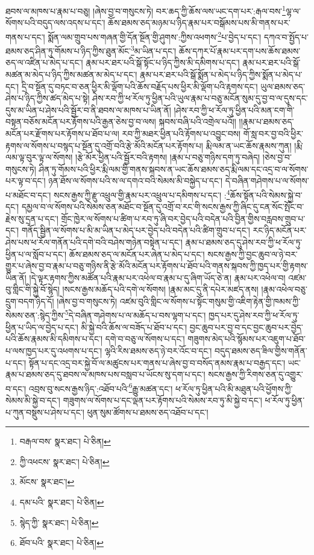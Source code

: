 ཐབས་ལ་མཁས་པ་རྣམ་པ་བཅུ། །ཞེས་བྱ་བ་གསུངས་ཏེ། བར་ཆད་ཀྱི་ཆོས་ལས་ཡང་དག་པར་:རྒལ་བས་\footnote{བརྒལ་བས་  སྣར་ཐང་།  པེ་ཅིན། }ལྷ་ལ་སོགས་པའི་བདུད་ལས་འདས་པ་དང་། ཆོས་ཐམས་ཅད་མཉམ་པ་ཉིད་རྣམ་པར་བསྒོམས་པས་མི་གནས་པར་གནས་པ་དང་། སྨོན་ལམ་གྲུབ་པས་གཞན་གྱི་དོན་སྔོན་གྱི་ཤུགས་:ཀྱིས་འཕགས་\footnote{ཀྱི་འཕངས་  སྣར་ཐང་།  པེ་ཅིན། }པ་བྱེད་པ་དང་། དཀའ་བ་སྤྱོད་པ་ཐམས་ཅད་ཤིན་ཏུ་གོམས་པ་ཉིད་ཀྱིས་ཐུན་མོང་\footnote{མོངས་  སྣར་ཐང་། }མ་ཡིན་པ་དང་། ཆོས་དཀར་པོ་རྣམ་པར་དག་པས་ཆོས་ཐམས་ཅད་ལ་འཛིན་པ་མེད་པ་དང་། རྣམ་པར་ཐར་པའི་སྒོ་སྟོང་པ་ཉིད་ཀྱིས་མི་དམིགས་པ་དང་། རྣམ་པར་ཐར་པའི་སྒོ་མཚན་མ་མེད་པ་ཉིད་ཀྱིས་མཚན་མ་མེད་པ་དང་། རྣམ་པར་ཐར་པའི་སྒོ་སྨོན་པ་མེད་པ་ཉིད་ཀྱིས་སྨོན་པ་མེད་པ་དང་། དྲི་བ་སྔོན་དུ་བཏང་བ་ཅན་ཕྱིར་མི་ལྡོག་པའི་ཆོས་བརྗོད་པས་ཕྱིར་མི་ལྡོག་པའི་རྟགས་དང་། ཡུལ་ཐམས་ཅད་ཤེས་པ་ཉིད་ཀྱིས་ཚད་མེད་པ་སྟེ། ཤེས་རབ་ཀྱི་ཕ་རོལ་ཏུ་ཕྱིན་པའི་ཡུལ་རྣམ་པ་བཅུ་མངོན་སུམ་དུ་བྱ་བ་ལ་དུས་དང་དུས་མ་ཡིན་པ་ཤེས་པའི་སྦྱོར་བ་ནི་ཐབས་ལ་མཁས་པ་ཡིན་ནོ། །ཤེས་རབ་ཀྱི་ཕ་རོལ་ཏུ་ཕྱིན་པའི་མན་ངག་གི་བསྟན་བཅོས་མངོན་པར་རྟོགས་པའི་རྒྱན་ཅེས་བྱ་བ་ལས། སྐབས་བཞི་པའི་འགྲེལ་པའོ།། །།རྣམ་པ་ཐམས་ཅད་མངོན་པར་རྫོགས་པར་རྟོགས་པ་ཐོབ་པ་ལ། རབ་ཀྱི་མཐར་ཕྱིན་པའི་རྟོགས་པ་འབྱུང་བས། གོ་སླ་བར་བྱ་བའི་ཕྱིར་རྟགས་ལ་སོགས་པ་བསྙད་པ་སྔོན་དུ་འགྲོ་བའི་རྩེ་མོའི་མངོན་པར་རྟོགས་པ། རྨི་ལམ་ན་ཡང་ཆོས་རྣམས་ཀུན། །རྨི་ལམ་ལྟ་བུར་ལྟ་ལ་སོགས། །རྩེ་མོར་ཕྱིན་པའི་སྦྱོར་བའི་རྟགས། །རྣམ་པ་བཅུ་གཉིས་དག་ཏུ་བཞེད། །ཅེས་བྱ་བ་གསུངས་ཏེ། ཤིན་ཏུ་གོམས་པའི་ཕྱིར་རྨི་ལམ་གྱི་གནས་སྐབས་ན་ཡང་ཆོས་ཐམས་ཅད་རྨི་ལམ་དང་འདྲ་བ་ལ་སོགས་པར་ལྟ་བ་དང་། ཉན་ཐོས་ལ་སོགས་པའི་ས་ལ་དགའ་བའི་སེམས་མི་བསྐྱེད་པ་དང་། དེ་བཞིན་གཤེགས་པ་ལ་སོགས་པ་མཐོང་བ་དང་། སངས་རྒྱས་ཀྱི་རྫུ་འཕྲུལ་གྱི་རྣམ་པར་འཕྲུལ་པ་དམིགས་པ་དང་། :\footnote{དམ་པའི་  སྣར་ཐང་།  པེ་ཅིན། }ཆོས་སྟོན་པའི་སེམས་སྐྱེ་བ་དང་། དམྱལ་བ་ལ་སོགས་པའི་སེམས་ཅན་མཐོང་བ་སྔོན་དུ་འགྲོ་བ་རང་གི་སངས་རྒྱས་ཀྱི་ཞིང་དུ་ངན་སོང་སྤོང་བ་རྗེས་སུ་དྲན་པ་དང་། གྲོང་ཁྱེར་ལ་སོགས་པ་ཚིག་པ་རབ་ཏུ་ཞི་བར་བྱེད་པའི་བདེན་པའི་བྱིན་གྱིས་བརླབས་གྲུབ་པ་དང་། གནོད་སྦྱིན་ལ་སོགས་པ་མི་མ་ཡིན་པ་མེད་པར་བྱེད་པའི་བདེན་པའི་ཚིག་གྲུབ་པ་དང་། རང་ཉིད་མངོན་པར་ཤེས་པས་ཕ་རོལ་གནོན་པའི་དགེ་བའི་བཤེས་གཉེན་བསྟེན་པ་དང་། རྣམ་པ་ཐམས་ཅད་དུ་ཤེས་རབ་ཀྱི་ཕ་རོལ་ཏུ་ཕྱིན་པ་ལ་སློབ་པ་དང་། ཆོས་ཐམས་ཅད་ལ་མངོན་པར་ཞེན་པ་མེད་པ་དང་། སངས་རྒྱས་ཀྱི་བྱང་ཆུབ་ལ་ཉེ་བར་གྱུར་པ་ཞེས་བྱ་བ་རྣམ་པ་བཅུ་གཉིས་ནི་རྩེ་མོའི་མངོན་པར་རྟོགས་པ་ཐོབ་པའི་གནས་སྐབས་ཀྱི་ཁྱད་པར་གྱི་རྟགས་ཡིན་ནོ། །དེ་ལྟར་རྟགས་ཀྱིས་མཚོན་པའི་རྣམ་པར་འཕེལ་བ་རྣམ་པ་དུ་ཞིག་ཡོད་ཅེ་ན། རྣམ་པར་འཕེལ་བ། འཛམ་བུ་གླིང་གི་སྐྱེ་བོ་སྙེད། །སངས་རྒྱས་མཆོད་པའི་དགེ་ལ་སོགས། །རྣམ་མང་དུ་ནི་དཔེར་མཛད་ནས། །རྣམ་འཕེལ་བཅུ་དྲུག་བདག་ཉིད་དོ། །ཞེས་བྱ་བ་གསུངས་ཏེ། འཛམ་བུའི་གླིང་ལ་སོགས་པ་སྟོང་གསུམ་གྱི་འཇིག་རྟེན་གྱི་ཁམས་ཀྱི་སེམས་ཅན་:སྙེད་ཀྱིས་\footnote{སྙེད་ཀྱི་  སྣར་ཐང་།  པེ་ཅིན། }དེ་བཞིན་གཤེགས་པ་ལ་མཆོད་པ་བས་ལྷག་པ་དང་། ཁྱད་པར་དུ་ཤེས་རབ་ཀྱི་ཕ་རོལ་ཏུ་ཕྱིན་པ་ཡིད་ལ་བྱེད་པ་དང་། མི་སྐྱེ་བའི་ཆོས་ལ་བཟོད་པ་ཐོབ་པ་དང་། བྱང་ཆུབ་པར་བྱ་བ་དང་བྱང་ཆུབ་པར་བྱེད་པའི་ཆོས་རྣམས་མི་དམིགས་པ་དང་། དགེ་བ་བཅུ་ལ་སོགས་པ་དང་། གཟུགས་མེད་པའི་སྙོམས་པར་འཇུག་པ་ཐོབ་པ་ལས་ཁྱད་པར་དུ་འཕགས་པ་དང་། ལྷའི་རིས་ཐམས་ཅད་ཉེ་བར་འོང་བ་དང་། བདུད་ཐམས་ཅད་ཟིལ་གྱིས་གནོན་པ་དང་། སྟོན་པ་དང་འདྲ་བར་སྐྱེ་བོ་ལ་མཚུངས་པར་གནས་པ་ཞེས་བྱ་བ་བསོད་ནམས་རྣམ་པ་བརྒྱད་དང་། ཡང་རྣམ་པ་ཐམས་ཅད་དུ་ཐབས་ལ་མཁས་པས་བསླབ་པ་ཡོངས་སུ་དག་པ་དང་། སངས་རྒྱས་ཀྱི་རིགས་ཅན་དུ་འགྱུར་བ་དང་། འབྲས་བུ་སངས་རྒྱས་ཉིད་:འཐོབ་པའི་\footnote{ཐོབ་པའི་  སྣར་ཐང་།  པེ་ཅིན། }རྒྱུ་མཚན་དང་། ཕ་རོལ་ཏུ་ཕྱིན་པའི་མི་མཐུན་པའི་ཕྱོགས་ཀྱི་སེམས་མི་སྐྱེ་བ་དང་། གཟུགས་ལ་སོགས་པ་དང་ལྡན་པར་རྟོགས་པའི་སེམས་རབ་ཏུ་མི་སྐྱེ་བ་དང་། ཕ་རོལ་ཏུ་ཕྱིན་པ་ཀུན་བསྡུས་པ་ཤེས་པ་དང་། ཕུན་སུམ་ཚོགས་པ་ཐམས་ཅད་འཐོབ་པ་དང་། 